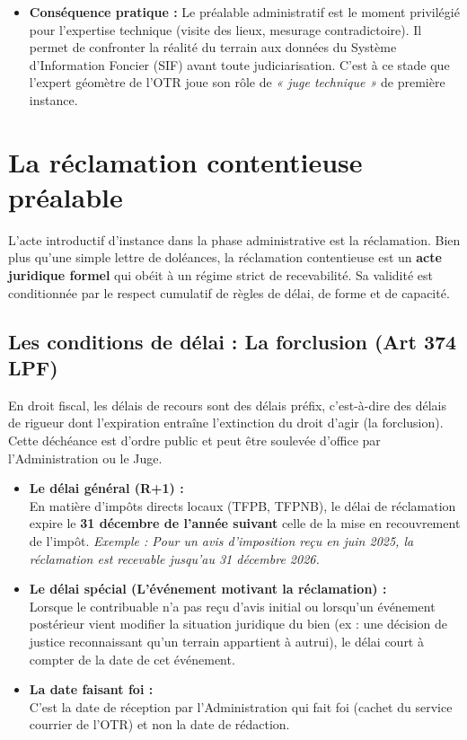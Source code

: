 \documentclass[Cours_contentieuxTF2026.tex]{subfiles}
\begin{document}
\begin{itemize}[label=\tiny$\blacksquare$]
	\item \textbf{Conséquence pratique :} Le préalable administratif est le moment privilégié pour l'expertise technique (visite des lieux, mesurage contradictoire). Il permet de confronter la réalité du terrain aux données du Système d'Information Foncier (SIF) avant toute judiciarisation. C'est à ce stade que l'expert géomètre de l'OTR joue son rôle de \textit{« juge technique »} de première instance.
\end{itemize}


\section{La réclamation contentieuse préalable}

L'acte introductif d'instance dans la phase administrative est la réclamation. Bien plus qu'une simple lettre de doléances, la réclamation contentieuse est un \textbf{acte juridique formel} qui obéit à un régime strict de recevabilité. Sa validité est conditionnée par le respect cumulatif de règles de délai, de forme et de capacité.

\subsection{Les conditions de délai : La forclusion (Art 374 LPF)}
En droit fiscal, les délais de recours sont des délais préfix, c'est-à-dire des délais de rigueur dont l'expiration entraîne l'extinction du droit d'agir (la forclusion). Cette déchéance est d'ordre public et peut être soulevée d'office par l'Administration ou le Juge.

\begin{itemize}
	\item \textbf{Le délai général (R+1) :} \\
	En matière d'impôts directs locaux (TFPB, TFPNB), le délai de réclamation expire le \textbf{31 décembre de l'année suivant} celle de la mise en recouvrement de l'impôt.
	\textit{Exemple : Pour un avis d'imposition reçu en juin 2025, la réclamation est recevable jusqu'au 31 décembre 2026.}
	
	\item \textbf{Le délai spécial (L'événement motivant la réclamation) :} \\
	Lorsque le contribuable n'a pas reçu d'avis initial ou lorsqu'un événement postérieur vient modifier la situation juridique du bien (ex : une décision de justice reconnaissant qu'un terrain appartient à autrui), le délai court à compter de la date de cet événement.
	
	\item \textbf{La date faisant foi :} \\
	C'est la date de réception par l'Administration qui fait foi (cachet du service courrier de l'OTR) et non la date de rédaction.
\end{itemize}
\end{document}

